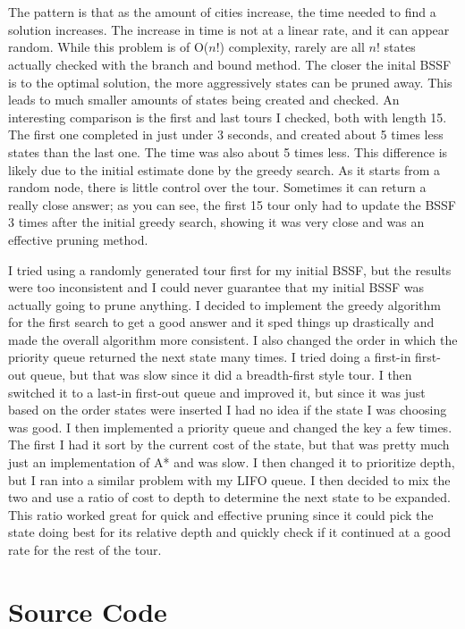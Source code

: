 \documentclass[11pt]{report} %
\begin{document}
\\\\
The pattern is that as the amount of cities increase, the time needed to find a solution increases.  The increase in time is not at a linear rate, and it can appear random.  While this problem is of O($n!$) complexity, rarely are all $n!$ states actually checked with the branch and bound method.  The closer the inital BSSF is to the optimal solution, the more aggressively states can be pruned away.  This leads to much smaller amounts of states being created and checked.  An interesting comparison is the first and last tours I checked, both with length 15.  The first one completed in just under 3 seconds, and created about 5 times less states than the last one.  The time was also about 5 times less.  This difference is likely due to the initial estimate done by the greedy search.  As it starts from a random node, there is little control over the tour.  Sometimes it can return a really close answer; as you can see, the first 15 tour only had to update the BSSF 3 times after the initial greedy search, showing it was very close and was an effective pruning method.

I tried using a randomly generated tour first for my initial BSSF, but the results were too inconsistent and I could never guarantee that my initial BSSF was actually going to prune anything.  I decided to implement the greedy algorithm for the first search to get a good answer and it sped things up drastically and made the overall algorithm more consistent.  I also changed the order in which the priority queue returned the next state many times.  I tried doing a first-in first-out queue, but that was slow since it did a breadth-first style tour.  I then switched it to a last-in first-out queue and improved it, but since it was just based on the order states were inserted I had no idea if the state I was choosing was good.  I then implemented a priority queue and changed the key a few times.  The first I had it sort by the current cost of the state, but that was pretty much just an implementation of A* and was slow.  I then changed it to prioritize depth, but I ran into a similar problem with my LIFO queue.  I then decided to mix the two and use a ratio of cost to depth to determine the next state to be expanded.  This ratio worked great for quick and effective pruning since it could pick the state doing best for its relative depth and quickly check if it continued at a good rate for the rest of the tour. 

\section*{Source Code}
\end{document}
